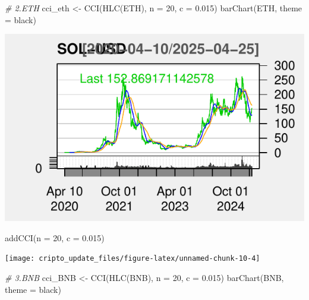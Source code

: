 \documentclass[]{tufte-handout}
\newenvironment{Shaded}{}{}
\newcommand{\AttributeTok}[1]{\textcolor[rgb]{0.49,0.56,0.16}{#1}}
\newcommand{\CommentTok}[1]{\textcolor[rgb]{0.38,0.63,0.69}{\textit{#1}}}
\newcommand{\DecValTok}[1]{\textcolor[rgb]{0.25,0.63,0.44}{#1}}
\newcommand{\FloatTok}[1]{\textcolor[rgb]{0.25,0.63,0.44}{#1}}
\newcommand{\FunctionTok}[1]{\textcolor[rgb]{0.02,0.16,0.49}{#1}}
\newcommand{\NormalTok}[1]{#1}
\newcommand{\OtherTok}[1]{\textcolor[rgb]{0.00,0.44,0.13}{#1}}
\newcommand{\StringTok}[1]{\textcolor[rgb]{0.25,0.44,0.63}{#1}}
\begin{document}
\begin{Shaded}
\begin{Highlighting}[]
\CommentTok{\# 2.ETH }
\NormalTok{cci\_eth }\OtherTok{\textless{}{-}} \FunctionTok{CCI}\NormalTok{(}\FunctionTok{HLC}\NormalTok{(ETH), }\AttributeTok{n =} \DecValTok{20}\NormalTok{, }\AttributeTok{c =} \FloatTok{0.015}\NormalTok{)}
\FunctionTok{barChart}\NormalTok{(ETH, }\AttributeTok{theme =} \StringTok{\textquotesingle{}black\textquotesingle{}}\NormalTok{)}
\end{Highlighting}
\end{Shaded}

\includegraphics{cripto_update_files/figure-latex/unnamed-chunk-10-3}

\begin{Shaded}
\begin{Highlighting}[]
\FunctionTok{addCCI}\NormalTok{(}\AttributeTok{n =} \DecValTok{20}\NormalTok{, }\AttributeTok{c =} \FloatTok{0.015}\NormalTok{)}
\end{Highlighting}
\end{Shaded}

\texttt{[image: cripto\_update\_files/figure-latex/unnamed-chunk-10-4]}

\begin{Shaded}
\begin{Highlighting}[]
\CommentTok{\# 3.BNB }
\NormalTok{cci\_BNB }\OtherTok{\textless{}{-}} \FunctionTok{CCI}\NormalTok{(}\FunctionTok{HLC}\NormalTok{(BNB), }\AttributeTok{n =} \DecValTok{20}\NormalTok{, }\AttributeTok{c =} \FloatTok{0.015}\NormalTok{)}
\FunctionTok{barChart}\NormalTok{(BNB, }\AttributeTok{theme =} \StringTok{\textquotesingle{}black\textquotesingle{}}\NormalTok{)}
\end{Highlighting}
\end{Shaded}
\end{document}

